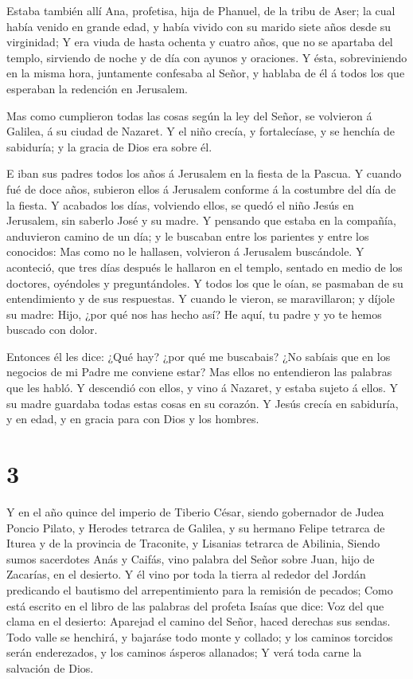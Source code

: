  Estaba también allí Ana, profetisa, hija de Phanuel, de la
tribu de Aser; la cual había venido en grande edad, y había vivido con
su marido siete años desde su virginidad;  Y era viuda de
hasta ochenta y cuatro años, que no se apartaba del templo, sirviendo de
noche y de día con ayunos y oraciones.  Y ésta,
sobreviniendo en la misma hora, juntamente confesaba al Señor, y hablaba
de él á todos los que esperaban la redención en Jerusalem.

 Mas como cumplieron todas las cosas según la ley del
Señor, se volvieron á Galilea, á su ciudad de Nazaret.  Y
el niño crecía, y fortalecíase, y se henchía de sabiduría; y la gracia
de Dios era sobre él.

 E iban sus padres todos los años á Jerusalem en la fiesta
de la Pascua.  Y cuando fué de doce años, subieron ellos á
Jerusalem conforme á la costumbre del día de la fiesta.  Y
acabados los días, volviendo ellos, se quedó el niño Jesús en Jerusalem,
sin saberlo José y su madre.  Y pensando que estaba en la
compañía, anduvieron camino de un día; y le buscaban entre los parientes
y entre los conocidos:  Mas como no le hallasen, volvieron
á Jerusalem buscándole.  Y aconteció, que tres días después
le hallaron en el templo, sentado en medio de los doctores, oyéndoles y
preguntándoles.  Y todos los que le oían, se pasmaban de su
entendimiento y de sus respuestas.  Y cuando le vieron, se
maravillaron; y díjole su madre: Hijo, ¿por qué nos has hecho así? He
aquí, tu padre y yo te hemos buscado con dolor.

 Entonces él les dice: ¿Qué hay? ¿por qué me buscabais? ¿No
sabíais que en los negocios de mi Padre me conviene estar? 
Mas ellos no entendieron las palabras que les habló.  Y
descendió con ellos, y vino á Nazaret, y estaba sujeto á ellos. Y su
madre guardaba todas estas cosas en su corazón.  Y Jesús
crecía en sabiduría, y en edad, y en gracia para con Dios y los hombres.

\hypertarget{section-2}{%
\section{3}\label{section-2}}

 Y en el año quince del imperio de Tiberio César, siendo
gobernador de Judea Poncio Pilato, y Herodes tetrarca de Galilea, y su
hermano Felipe tetrarca de Iturea y de la provincia de Traconite, y
Lisanias tetrarca de Abilinia,  Siendo sumos sacerdotes Anás
y Caifás, vino palabra del Señor sobre Juan, hijo de Zacarías, en el
desierto.  Y él vino por toda la tierra al rededor del
Jordán predicando el bautismo del arrepentimiento para la remisión de
pecados;  Como está escrito en el libro de las palabras del
profeta Isaías que dice: Voz del que clama en el desierto: Aparejad el
camino del Señor, haced derechas sus sendas.  Todo valle se
henchirá, y bajaráse todo monte y collado; y los caminos torcidos serán
enderezados, y los caminos ásperos allanados;  Y verá toda
carne la salvación de Dios.

